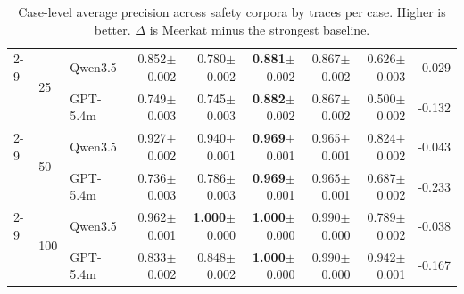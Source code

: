 \documentclass{article} %
\newcommand{\res}[2]{#1{\scriptsize$\pm$#2}}
\newcommand{\bestres}[2]{\textbf{#1}{\scriptsize$\pm$#2}}
\begin{document}
\begin{table}[t]
\begin{tabular}{@{}lllrrrrrr@{}}
    \cmidrule(lr){2-9}
     & \multirow{2}{*}{25} & Qwen3.5 & \res{0.852}{0.002} & \res{0.780}{0.002} & \bestres{0.881}{0.002} & \res{0.867}{0.002} & \res{0.626}{0.003} & -0.029 \\
     & & GPT-5.4m & \res{0.749}{0.003} & \res{0.745}{0.003} & \bestres{0.882}{0.002} & \res{0.867}{0.002} & \res{0.500}{0.002} & -0.132 \\
    \cmidrule(lr){2-9}
     & \multirow{2}{*}{50} & Qwen3.5 & \res{0.927}{0.002} & \res{0.940}{0.001} & \bestres{0.969}{0.001} & \res{0.965}{0.001} & \res{0.824}{0.002} & -0.043 \\
     & & GPT-5.4m & \res{0.736}{0.003} & \res{0.786}{0.003} & \bestres{0.969}{0.001} & \res{0.965}{0.001} & \res{0.687}{0.002} & -0.233 \\
    \cmidrule(lr){2-9}
     & \multirow{2}{*}{100} & Qwen3.5 & \res{0.962}{0.001} & \bestres{1.000}{0.000} & \bestres{1.000}{0.000} & \res{0.990}{0.000} & \res{0.789}{0.002} & -0.038 \\
     & & GPT-5.4m & \res{0.833}{0.002} & \res{0.848}{0.002} & \bestres{1.000}{0.000} & \res{0.990}{0.000} & \res{0.942}{0.001} & -0.167 \\
    \bottomrule
  \end{tabular}
  \caption{Case-level average precision across safety corpora by traces per case. Higher is better. $\Delta$ is Meerkat minus the strongest baseline.}
  \label{tab:reward-ap-case}
\end{table}
\end{document}
